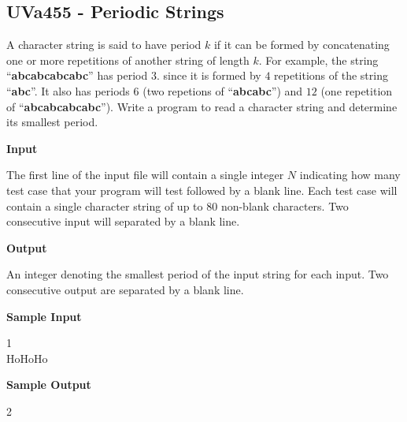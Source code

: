 \subsection{UVa455 - Periodic Strings}
A character string is said to have period $k$ if it can be formed by concatenating one or more repetitions of another string of length $k$. For example, the string ``\textbf{abcabcabcabc}'' has period $3$. since it is formed by $4$ repetitions of the string ``\textbf{abc}''. It also has periods $6$ (two repetions of ``\textbf{abcabc}'') and $12$ (one repetition of ``\textbf{abcabcabcabc}'').
Write a program to read a character string and determine its smallest period.

\begin{flushleft}
{\color{red} \textbf{Input}}
\end{flushleft}
The first line of the input file will contain a single integer $N$ indicating how many test case that your program will test followed by a blank line. Each test case will contain a single character string of up to $80$ non-blank characters. Two consecutive input will separated by a blank line.

\begin{flushleft}
{\color{red} \textbf{Output}}
\end{flushleft}
An integer denoting the smallest period of the input string for each input. Two consecutive output are separated by a blank line.

\begin{flushleft}
{\color{red} \textbf{Sample Input}}
\end{flushleft}
\begin{flushleft}
1\\
\bigskip
HoHoHo\\
\end{flushleft}

\begin{flushleft}
{\color{red} \textbf{Sample Output}}
\end{flushleft}
\begin{flushleft}
2\\
\end{flushleft}

\newpage